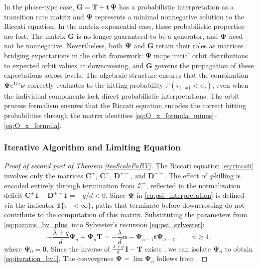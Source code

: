 \documentclass[a4paper,11pt]{article}
\numberwithin{equation}{section}
\theoremstyle{plain}
\theoremstyle{definition}
\newcommand{\1}{\mathbf{1}}
\newcommand{\PP}{\mathbb{P}}
\begin{document}
In the phase-type case, $\bm{G} = \bm{T} + \bm{t}\,\bm{\Psi}$ has a probabilistic interpretation as a transition rate matrix and $\bm{\Psi}$ represents a minimal nonnegative solution to the Riccati equation. In the matrix-exponential case, these probabilistic properties are lost. The matrix $\bm{G}$ is no longer guaranteed to be a generator, and $\bm{\Psi}$ need not be nonnegative. Nevertheless, both $\bm{\Psi}$ and $\bm{G}$ retain their roles as matrices bridging expectations in the orbit framework: $\bm{\Psi}$ maps initial orbit distributions to expected orbit values at downcrossing, and $\bm{G}$ governs the propagation of these expectations across levels. The algebraic structure ensures that the combination $\bm{\Psi} e^{\bm{G}x}\bm{\nu}$ correctly evaluates to the hitting probability $\PP(\tau_{\{-x\}}<e_q)$, even when the individual components lack direct probabilistic interpretations. The orbit process formalism ensures that the Riccati equation encodes the correct hitting probabilities through the matrix identities \eqref{eq:O_x_formula_minus}--\eqref{eq:O_x_formula}.



\subsubsection{Iterative Algorithm and Limiting Equation}



\begin{proof}[Proof of second part of Theorem \ref{teoScaleFnBV}]
The Riccati equation \eqref{eq:riccati} involves only the matrices $\bm{C}^+$, $\bm{C}^-$, $\bm{D}^{+-}$, and $\bm{D}^{-+}$. The effect of $q$-killing is encoded entirely through termination from $\mathcal{Z}^+$, reflected in the normalization deficit $\bm{C}^+\bm{1} + \bm{D}^{+-}\bm{1} = -q/d < 0$. Since $\bm{\Psi}$ in \eqref{eq:psi_interpretation} is defined via the indicator $\mathds{1}\{\tau_- < \infty\}$, paths that terminate before downcrossing do not contribute to the computation of this matrix.
Substituting the parameters from \eqref{eq:params_bv_plus} into Sylvester's recursion \eqref{eq:psi_sylvester}:
\begin{equation}\label{eq:Sylvester_bv}
-\frac{\lambda + q}{d} \bm{\Psi}_n + \bm{\Psi}_n \bm{T} 
= -\frac{\lambda}{d}\bm{\alpha} - \bm{\Psi}_{n-1}\bm{t}\bm{\Psi}_{n-1},
\qquad n\ge 1,
\end{equation}
where $\bm{\Psi}_0 = \bm{0}$. Since the inverse of $\frac{\lambda + q}{d}\,\bm{I} - \bm{T}$ exists \cite[Theorem 4.1.6]{BladtNielsen2017}, we can isolate $\bm{\Psi}_n$ to obtain \eqref{eq:iteration_bv1}. The convergence $\bm{\Psi} = \lim \bm{\Psi}_n$ follows from \cite[Theorem 4.1]{BeanNguyenNielsenPeralta2022}.
\end{proof}
\end{document}
